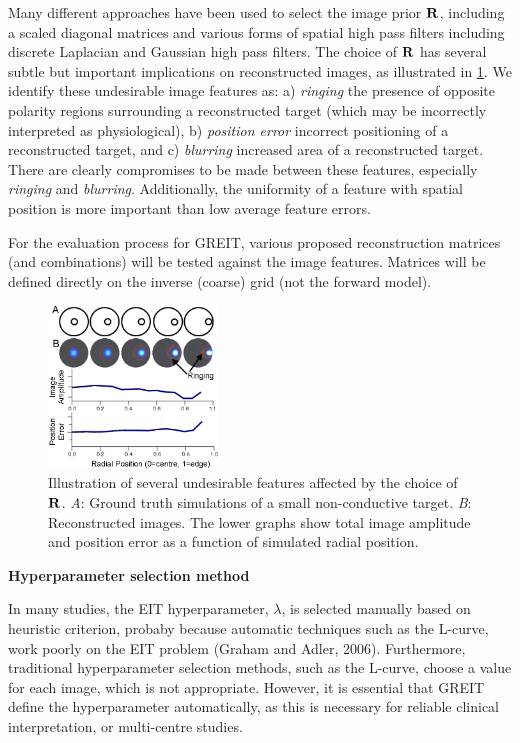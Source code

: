 \documentclass[letterpaper,twocolumn,11pt]{article}
\newcommand{\RB}{\mbox{$\bf R$}}
\begin{document}
\begin{list}{\bf {}.}
Many different approaches have been used to select
the image prior $\RB$, including a scaled diagonal
matrices and various forms of spatial high pass
filters including discrete Laplacian and Gaussian
high pass filters. The choice of $\RB$ has several
subtle but important implications on reconstructed
images, as illustrated in \ref{fig:prior_effects}.
We identify these undesirable image features as:
a) {\em ringing} the presence of opposite polarity
regions surrounding a reconstructed target (which
may be incorrectly interpreted as physiological),
b) {\em position error} incorrect positioning of
a reconstructed target,
and 
c) {\em blurring} increased area of a reconstructed
target.
There are clearly compromises to be made between
these features, especially {\em ringing} and
{\em blurring}. Additionally, the uniformity of
a feature with spatial position is more important
than low average feature errors.

For the evaluation process for GREIT, various
proposed reconstruction matrices (and combinations)
will be tested against the image features. Matrices
will be defined directly on the inverse (coarse) grid
(not the forward model).


\begin{figure}[tbh]
\begin{center}
 \includegraphics[width= 0.4\textwidth, bb=0 0 512 532]{figs/spatial-uniformity.png}
\caption{ \label{fig:prior_effects}
\small
Illustration of several undesirable features affected by the
choice of $\RB$. {\em A}: Ground truth simulations of a small
non-conductive target. {\em B}: Reconstructed images. The
lower graphs show total image amplitude and position error
as a function of simulated radial position.%
}
\end{center}
\end{figure}

\item {\bf Hyperparameter selection method}

In many studies, the EIT hyperparameter, $\lambda$, is selected
manually based on heuristic criterion, probaby because
automatic techniques such as the L-curve, work poorly
on the EIT problem (Graham and Adler, 2006).  Furthermore,
traditional hyperparameter selection methods, such as the L-curve,
choose a value for each image, which is not appropriate.
 However, it
is essential that GREIT define the hyperparameter 
automatically, as this is necessary for reliable
clinical interpretation, or multi-centre studies.


\end{list}
\end{document}
